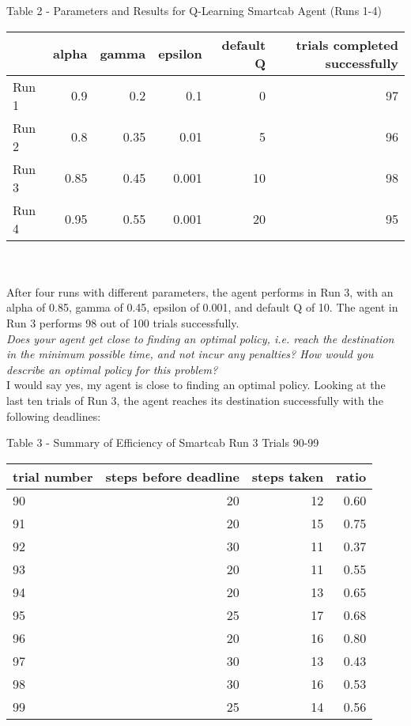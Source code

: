 \documentclass[11pt]{article}
\begin{document}
\begin{center} Table 2 - Parameters and Results for Q-Learning Smartcab Agent (Runs 1-4)
\end{center}
\begin{tabular}{ l r r r r r } \\
  \hline
  & alpha & gamma & epsilon & default Q & trials completed successfully\\
  \hline
  Run 1 & 0.9 & 0.2 & 0.1 & 0 & 97 \\
  Run 2 & 0.8 & 0.35 & 0.01 & 5 & 96 \\
  Run 3 & 0.85 & 0.45 & 0.001 & 10 & 98 \\
  Run 4 & 0.95 & 0.55 & 0.001 & 20 & 95 \\
\end{tabular}\\
\\

After four runs with different parameters, the agent performs in Run 3, with an alpha of 0.85, gamma of 0.45, epsilon of 0.001, and default Q of 10. The agent in Run 3 performs 98 out of 100 trials successfully.\\

\textit{Does your agent get close to finding an optimal policy, i.e. reach the destination in the minimum possible time, and not incur any penalties? How would you describe an optimal policy for this problem?}\\

I would say yes, my agent is close to finding an optimal policy. Looking at the last ten trials of Run 3, the agent reaches its destination successfully with the following deadlines:\\

\begin{center} Table 3 - Summary of Efficiency of Smartcab Run 3 Trials 90-99

\begin{tabular}{ l r r r } \\
  \hline
  trial number & steps before deadline & steps taken & ratio\\
  \hline
  90 & 20 & 12 & 0.60 \\
  91 & 20 & 15 & 0.75 \\
  92 & 30 & 11 & 0.37 \\
  93 & 20 & 11 & 0.55 \\
  94 & 20 & 13 & 0.65 \\
  95 & 25 & 17 & 0.68 \\
  96 & 20 & 16 & 0.80 \\
  97 & 30 & 13 & 0.43 \\
  98 & 30 & 16 & 0.53 \\
  99 & 25 & 14 & 0.56 \\
\end{tabular}
\end{center}
\\
\end{document}
